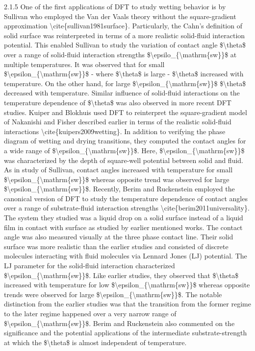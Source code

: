 \par 2.1.5 One of the first applications of DFT to study wetting behavior is by Sullivan who employed the Van der Vaals theory without the square-gradient approximation \textbackslash cite\{sullivan1981surface\}. Particularly, the Cahn's definition of solid surface was reinterpreted in terms of a more realistic solid-fluid interaction potential. This enabled Sullivan to study the variation of contact angle \$\textbackslash theta\$ over a range of solid-fluid interaction strengths \$\textbackslash epsilo\_\{\textbackslash mathrm\{sw\}\}\$ at multiple temperatures. It was observed that for small \$\textbackslash epsilon\_\{\textbackslash mathrm\{sw\}\}\$ - where \$\textbackslash theta\$ is large - \$\textbackslash theta\$ increased with temperature. On the other hand, for large \$\textbackslash epsilon\_\{\textbackslash mathrm\{sw\}\}\$ \$\textbackslash theta\$ decreased with temperature. Similar influence of solid-fluid interactions on the temperature dependence of \$\textbackslash theta\$ was also observed in more recent DFT studies. Kuiper and Blokhuis used DFT to reinterpret the square-gradient model of Nakanishi and Fisher described earlier in terms of the realistic solid-fluid interactions \textbackslash cite\{kuipers2009wetting\}. In addition to verifying the phase diagram of wetting and drying transitions, they computed the contact angles for a wide range of \$\textbackslash epsilon\_\{\textbackslash mathrm\{sw\}\}\$. Here, \$\textbackslash epsilon\_\{\textbackslash mathrm\{sw\}\}\$ was characterized by the depth of square-well potential between solid and fluid. As in study of Sullivan, contact angles increased with temperature for small  \$\textbackslash epsilon\_\{\textbackslash mathrm\{sw\}\}\$ whereas opposite trend was observed for large  \$\textbackslash epsilon\_\{\textbackslash mathrm\{sw\}\}\$. Recently, Berim and Ruckenstein employed the canonical version of DFT to study the temperature dependence of contact angles over a range of substrate-fluid interaction strengths \textbackslash cite\{berim2011universality\}. The system they studied was a liquid drop on a solid surface instead of a liquid film in contact with surface as studied by earlier mentioned works. The contact angle was also measured visually at the three phase contact line. Their solid surface was more realistic than the earlier studies and consisted of discrete molecules interacting with fluid molecules via Lennard Jones (LJ) potential. The LJ parameter for the solid-fluid interaction characterized \$\textbackslash epsilon\_\{\textbackslash mathrm\{sw\}\}\$. Like earlier studies, they observed that \$\textbackslash theta\$ increased with temperature for low \$\textbackslash epsilon\_\{\textbackslash mathrm\{sw\}\}\$ whereas opposite trends were observed for large \$\textbackslash epsilon\_\{\textbackslash mathrm\{sw\}\}\$. The notable distinction from the earlier studies was that the transition from the former regime to the later regime happened over a very narrow range of \$\textbackslash epsilon\_\{\textbackslash mathrm\{sw\}\}\$. Berim and Ruckenstein also commented on the significance and the potential applications of the intermediate substrate-strength at which the \$\textbackslash theta\$ is almost independent of temperature. 